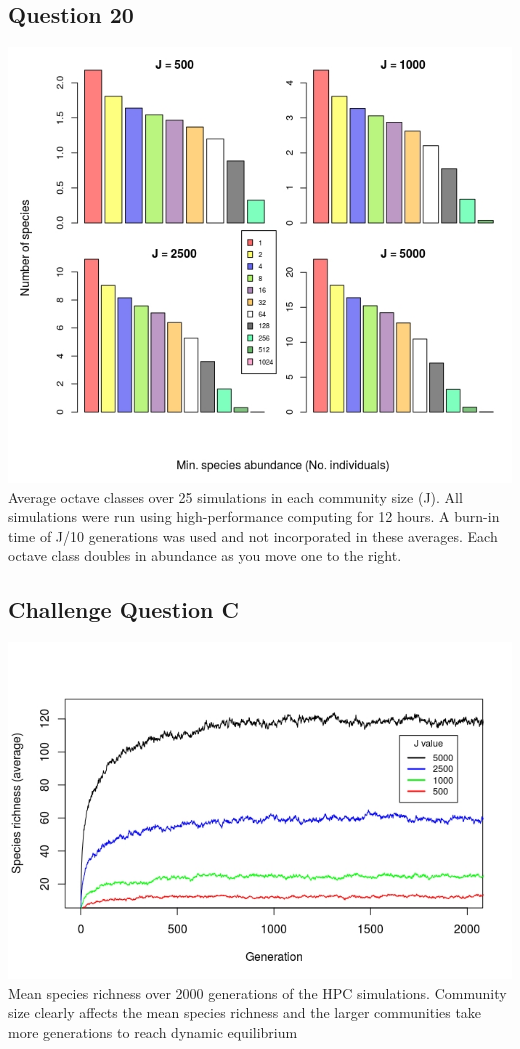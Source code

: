 \documentclass{article}
\begin{document}
\subsection*{Question 20}

\begin{center}
  \includegraphics[width=\textwidth]{../Results/question_20.jpeg}
   {Average octave classes over 25 simulations in each community size (J).
  All simulations were run using high-performance computing for 12 hours. A burn-in time of 
  J/10 generations was used and not incorporated in these averages. Each octave class doubles 
  in abundance as you move one to the right.}
\end{center}

\subsection*{Challenge Question C}

\begin{center}
  \includegraphics[width=\textwidth]{../Results/challenge_C.jpeg}
   {Mean species richness over 2000 generations of the HPC simulations.
  Community size clearly affects the mean species richness and the larger communities take more
  generations to reach dynamic equilibrium}
\end{center}
\end{document}
